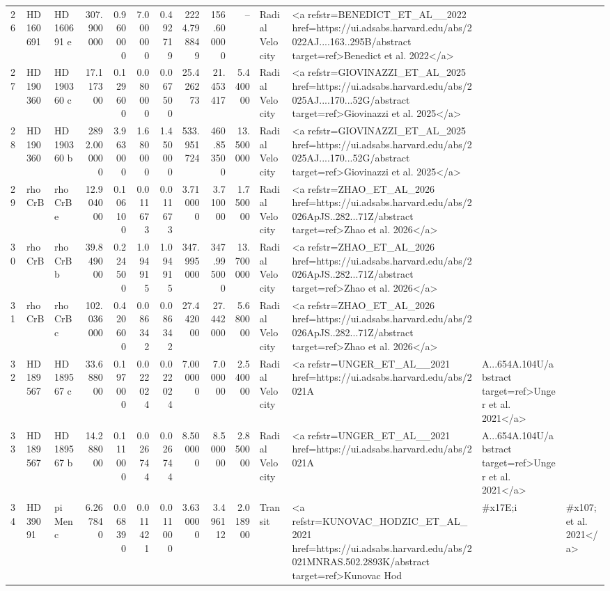 \begin{tabular}{lllrrrrrrrll}
26 & HD 160691 & HD 160691 e & 307.900000 & 0.960000 & 7.000000 & 0.492719 & 2224.798849 & 156.600000 & -- & Radial Velocity & <a refstr=BENEDICT_ET_AL__2022 href=https://ui.adsabs.harvard.edu/abs/2022AJ....163..295B/abstract target=ref>Benedict et al. 2022</a> \\
27 & HD 190360 & HD 190360 c & 17.117300 & 0.129600 & 0.080000 & 0.067500 & 25.426273 & 21.453417 & 5.440000 & Radial Velocity & <a refstr=GIOVINAZZI_ET_AL_2025 href=https://ui.adsabs.harvard.edu/abs/2025AJ....170...52G/abstract target=ref>Giovinazzi et al. 2025</a> \\
28 & HD 190360 & HD 190360 b & 2892.000000 & 3.963000 & 1.680000 & 1.450000 & 533.951724 & 460.853500 & 13.500000 & Radial Velocity & <a refstr=GIOVINAZZI_ET_AL_2025 href=https://ui.adsabs.harvard.edu/abs/2025AJ....170...52G/abstract target=ref>Giovinazzi et al. 2025</a> \\
29 & rho CrB & rho CrB e & 12.904000 & 0.106100 & 0.011673 & 0.011673 & 3.710000 & 3.710000 & 1.750000 & Radial Velocity & <a refstr=ZHAO_ET_AL_2026 href=https://ui.adsabs.harvard.edu/abs/2026ApJS..282...71Z/abstract target=ref>Zhao et al. 2026</a> \\
30 & rho CrB & rho CrB b & 39.849000 & 0.224500 & 1.094915 & 1.094915 & 347.995000 & 347.995000 & 13.700000 & Radial Velocity & <a refstr=ZHAO_ET_AL_2026 href=https://ui.adsabs.harvard.edu/abs/2026ApJS..282...71Z/abstract target=ref>Zhao et al. 2026</a> \\
31 & rho CrB & rho CrB c & 102.036000 & 0.420600 & 0.086342 & 0.086342 & 27.442000 & 27.442000 & 5.680000 & Radial Velocity & <a refstr=ZHAO_ET_AL_2026 href=https://ui.adsabs.harvard.edu/abs/2026ApJS..282...71Z/abstract target=ref>Zhao et al. 2026</a> \\
32 & HD 189567 & HD 189567 c & 33.688000 & 0.197000 & 0.022024 & 0.022024 & 7.000000 & 7.000000 & 2.540000 & Radial Velocity & <a refstr=UNGER_ET_AL__2021 href=https://ui.adsabs.harvard.edu/abs/2021A&A...654A.104U/abstract target=ref>Unger et al. 2021</a> \\
33 & HD 189567 & HD 189567 b & 14.288000 & 0.111000 & 0.026744 & 0.026744 & 8.500000 & 8.500000 & 2.850000 & Radial Velocity & <a refstr=UNGER_ET_AL__2021 href=https://ui.adsabs.harvard.edu/abs/2021A&A...654A.104U/abstract target=ref>Unger et al. 2021</a> \\
34 & HD 39091 & pi Men c & 6.267840 & 0.068390 & 0.011421 & 0.011000 & 3.630000 & 3.496112 & 2.018900 & Transit & <a refstr=KUNOVAC_HODZIC_ET_AL_2021 href=https://ui.adsabs.harvard.edu/abs/2021MNRAS.502.2893K/abstract target=ref>Kunovac Hod&#x17E;i&#x107; et al. 2021</a> \\

\end{tabular}
